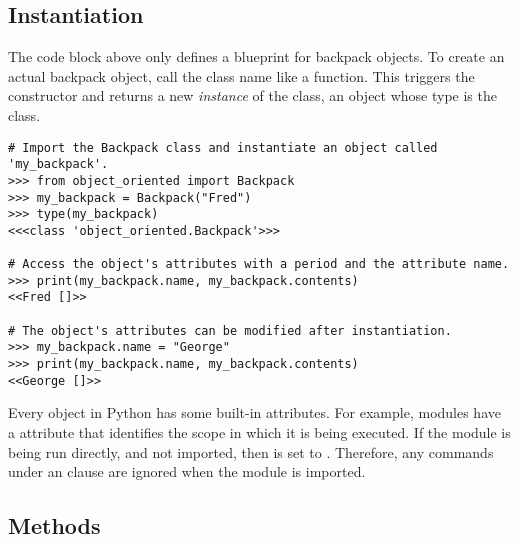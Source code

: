 \subsection*{Instantiation} %

The  code block above only defines a blueprint for backpack objects.
To create an actual backpack object, call the class name like a function.
This triggers the constructor and returns a new \emph{instance} of the class, an object whose type is the class.

\begin{lstlisting}
# Import the Backpack class and instantiate an object called 'my_backpack'.
>>> from object_oriented import Backpack
>>> my_backpack = Backpack("Fred")
>>> type(my_backpack)
<<<class 'object_oriented.Backpack'>>>

# Access the object's attributes with a period and the attribute name.
>>> print(my_backpack.name, my_backpack.contents)
<<Fred []>>

# The object's attributes can be modified after instantiation.
>>> my_backpack.name = "George"
>>> print(my_backpack.name, my_backpack.contents)
<<George []>>
\end{lstlisting}

\begin{info} %
Every object in Python has some built-in attributes.
For example, modules have a  attribute that identifies the scope in which it is being executed.
If the module is being run directly, and not imported, then  is set to .
Therefore, any commands under an  clause are ignored when the module is imported.
%
%
\end{info}

\subsection*{Methods} %

